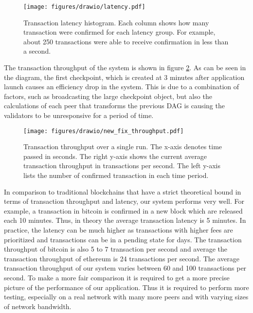\begin{figure}[htbp]
    \centering
    \label{fig:txn_latency}
    \texttt{[image: figures/drawio/latency.pdf]}
	\caption{\footnotesize{Transaction latency histogram. Each column shows how many transaction were confirmed for each latency group. For example, about 250 transactions were able to receive confirmation in less than a second.}}
\end{figure}

 The transaction throughput of the system is shown in figure \ref{fig:txn_throughput}. As can be seen in the diagram, the first checkpoint, which is created at 3 minutes after application launch causes an efficiency drop in the system. This is due to a combination of factors, such as broadcasting the large checkpoint object, but also the calculations of each peer that transforms the previous DAG is causing the validators to be unresponsive for a period of time.  


\begin{figure}[htbp]
    \centering
    \texttt{[image: figures/drawio/new\_fix\_throughput.pdf]}
	\caption{\footnotesize{Transaction throughput over a single run. The x-axis denotes time passed in seconds. The right y-axis shows the current average transaction throughput in transactions per second. The left y-axis lists the number of confirmed transaction in each time period.}}
	\label{fig:txn_throughput}
\end{figure}
 
In comparison to traditional blockchains that have a strict theoretical bound in terms of transaction throughput and latency, our system performs very well. For example, a transaction in bitcoin is confirmed in a new block which are released each 10 minutes. Thus, in theory the average transaction latency is 5 minutes. In practice, the latency can be much higher as transactions with higher fees are prioritized and transactions can be in a pending state for days.
The transaction throughput of bitcoin is also 5 to 7 transaction per second and average the transaction throughput of ethereum is 24 transactions per second. The average transaction throughput of our system varies between 60 and 100 transactions per second. To make a more fair comparison it is required to get a more precise picture of the performance of our application. Thus it is required to perform more testing, especially on a real network with many more peers and with varying sizes of network bandwidth.